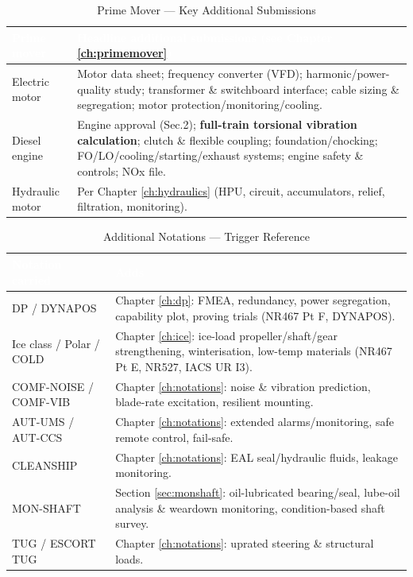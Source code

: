 \documentclass[11pt,a4paper]{report}
\begin{document}
\begin{table}[H]
\centering
\caption{Prime Mover --- Key Additional Submissions}
\begin{tabular}{|p{3.2cm}|p{11.5cm}|}
\hline
\rowcolor{bvblue}
\textcolor{white}{\textbf{Prime mover}} & \textcolor{white}{\textbf{Headline additional submissions (see Chapter \ref{ch:primemover})}} \\
\hline
Electric motor & Motor data sheet; frequency converter (VFD); harmonic/power-quality study; transformer \& switchboard interface; cable sizing \& segregation; motor protection/monitoring/cooling. \\
\hline
Diesel engine & Engine approval (Sec.2); \textbf{full-train torsional vibration calculation}; clutch \& flexible coupling; foundation/chocking; FO/LO/cooling/starting/exhaust systems; engine safety \& controls; NOx file. \\
\hline
Hydraulic motor & Per Chapter \ref{ch:hydraulics} (HPU, circuit, accumulators, relief, filtration, monitoring). \\
\hline
\end{tabular}
\end{table}

\begin{table}[H]
\centering
\caption{Additional Notations --- Trigger Reference}
\begin{tabular}{|p{4cm}|p{10.7cm}|}
\hline
\rowcolor{bvblue}
\textcolor{white}{\textbf{Notation carried}} & \textcolor{white}{\textbf{Adds}} \\
\hline
DP / DYNAPOS & Chapter \ref{ch:dp}: FMEA, redundancy, power segregation, capability plot, proving trials (NR467 Pt F, DYNAPOS). \\
\hline
Ice class / Polar / COLD & Chapter \ref{ch:ice}: ice-load propeller/shaft/gear strengthening, winterisation, low-temp materials (NR467 Pt E, NR527, IACS UR I3). \\
\hline
COMF-NOISE / COMF-VIB & Chapter \ref{ch:notations}: noise \& vibration prediction, blade-rate excitation, resilient mounting. \\
\hline
AUT-UMS / AUT-CCS & Chapter \ref{ch:notations}: extended alarms/monitoring, safe remote control, fail-safe. \\
\hline
CLEANSHIP & Chapter \ref{ch:notations}: EAL seal/hydraulic fluids, leakage monitoring. \\
\hline
MON-SHAFT & Section \ref{sec:monshaft}: oil-lubricated bearing/seal, lube-oil analysis \& weardown monitoring, condition-based shaft survey. \\
\hline
TUG / ESCORT TUG & Chapter \ref{ch:notations}: uprated steering \& structural loads. \\
\hline
\end{tabular}
\end{table}
\end{document}
